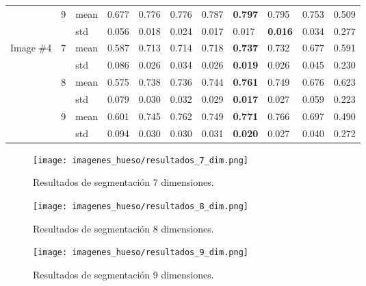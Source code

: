 \documentclass[conference]{IEEEtran}
\begin{document}
\begin{table*}
\begin{tabularx}{\textwidth}{|X|X|X|X|X|X|X|X|X|X|X|}
& \multirow{2}{*}{9} & mean & 0.677 & 0.776 & 0.776 & 0.787 & \textbf{0.797} & 0.795 & 0.753 & 0.509 \\ \cline{3-11} 
& & std & 0.056 & 0.018 & 0.024 & 0.017 & 0.017 & \textbf{0.016} & 0.034 & 0.277\\ \hline
\multirow{6}{*}{Image \#4} & \multirow{2}{*}{7} & mean & 0.587 & 0.713 & 0.714 & 0.718 & \textbf{0.737} & 0.732 & 0.677 & 0.591 \\ \cline{3-11} 
& & std & 0.086 & 0.026 & 0.034 & 0.026 & \textbf{0.019} & 0.026 & 0.045 & 0.230\\ \cline{2-11} 
& \multirow{2}{*}{8} & mean & 0.575 & 0.738 & 0.736 & 0.744 & \textbf{0.761} & 0.749 & 0.676 & 0.623 \\ \cline{3-11} 
& & std &  0.079 & 0.030 & 0.032 & 0.029 & \textbf{0.017} & 0.027 & 0.059 & 0.223\\ \cline{2-11} 
& \multirow{2}{*}{9} & mean & 0.601 & 0.745 & 0.762 & 0.749 & \textbf{0.771} & 0.766 & 0.697 & 0.490 \\ \cline{3-11} 
& & std & 0.094 & 0.030 & 0.030 & 0.031 & \textbf{0.020} & 0.027 & 0.040 & 0.272\\ \hline
\end{tabularx}
\label{tab:anexoC}
\end{table*}




\begin{figure*}[!htb]
    \centering
    \texttt{[image: imagenes\_hueso/resultados\_7\_dim.png]}
    \caption{Resultados de segmentación 7 dimensiones.}
    \label{fig:resultados7dim}
\end{figure*}
\begin{figure*}[!htb]
    \centering
    \texttt{[image: imagenes\_hueso/resultados\_8\_dim.png]}
    \caption{Resultados de segmentación 8 dimensiones.}
    \label{fig:resultados8dim}
\end{figure*}
\begin{figure*}[!htb]
    \centering
    \texttt{[image: imagenes\_hueso/resultados\_9\_dim.png]}
    \caption{Resultados de segmentación 9 dimensiones.}
    \label{fig:resultados9dim}
\end{figure*}
\end{document}
